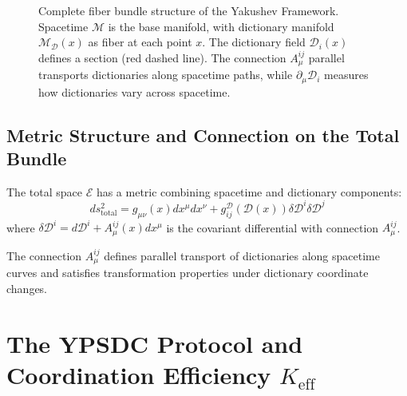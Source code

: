 \documentclass[11pt,a4paper]{article}
\begin{document}
\begin{figure}[htbp]
		\caption{Complete fiber bundle structure of the Yakushev Framework. Spacetime $\mathcal{M}$ is the base manifold, with dictionary manifold $\mathcal{M}_{\mathcal{D}}(x)$ as fiber at each point $x$. The dictionary field $\mathcal{D}_i(x)$ defines a section (red dashed line). The connection $A_\mu^{ij}$ parallel transports dictionaries along spacetime paths, while $\partial_\mu \mathcal{D}_i$ measures how dictionaries vary across spacetime.}
		\label{fig:complete-bundle}
	\end{figure}
	
	\subsection{Metric Structure and Connection on the Total Bundle}
	The total space $\mathcal{E}$ has a metric combining spacetime and dictionary components:
	\begin{equation}
		ds^2_{\text{total}} = g_{\mu\nu}(x) dx^\mu dx^\nu + g_{ij}^{\mathcal{D}}(\mathcal{D}(x)) \delta\mathcal{D}^i \delta\mathcal{D}^j
	\end{equation}
	where $\delta\mathcal{D}^i = d\mathcal{D}^i + A_\mu^{ij}(x) dx^\mu$ is the covariant differential with connection $A_\mu^{ij}$.
	
	The connection $A_\mu^{ij}$ defines parallel transport of dictionaries along spacetime curves and satisfies transformation properties under dictionary coordinate changes.
	
	\section{The YPSDC Protocol and Coordination Efficiency \texorpdfstring{$K_{\mathrm{eff}}$}{K_eff}}
	
\end{document}
